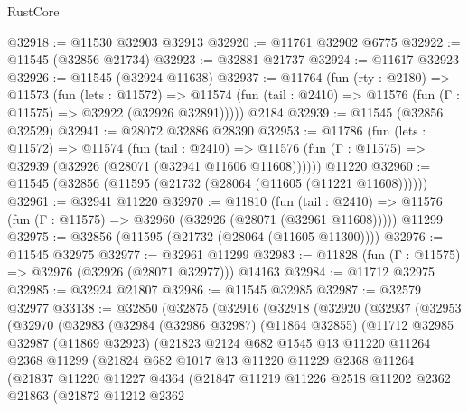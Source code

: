 \begin{lexlean}{RustCore}
\begin{coremodule}
@32918 := @11530 @32903 @32913
@32920 := @11761 @32902 @6775
@32922 := @11545 (@32856 @21734)
@32923 := @32881 @21737
@32924 := @11617 @32923
@32926 := @11545 (@32924 @11638)
@32937 := @11764
    (fun (rty : @2180) =>
    @11573
      (fun (lets : @11572) =>
      @11574 (fun (tail : @2410) => @11576 (fun (Γ : @11575) => @32922 (@32926 @32891)))))
    @2184
@32939 := @11545 (@32856 @32529)
@32941 := @28072 @32886 @28390
@32953 := @11786
    (fun (lets : @11572) =>
    @11574
      (fun (tail : @2410) =>
      @11576 (fun (Γ : @11575) => @32939 (@32926 (@28071 (@32941 @11606 @11608))))))
    @11220
@32960 := @11545 (@32856 (@11595 (@21732 (@28064 (@11605 (@11221 @11608))))))
@32961 := @32941 @11220
@32970 := @11810
    (fun (tail : @2410) => @11576 (fun (Γ : @11575) => @32960 (@32926 (@28071 (@32961 @11608)))))
    @11299
@32975 := @32856 (@11595 (@21732 (@28064 (@11605 @11300))))
@32976 := @11545 @32975
@32977 := @32961 @11299
@32983 := @11828 (fun (Γ : @11575) => @32976 (@32926 (@28071 @32977))) @14163
@32984 := @11712 @32975
@32985 := @32924 @21807
@32986 := @11545 @32985
@32987 := @32579 @32977
@33138 := @32850
    (@32875
      (@32916
        (@32918
          (@32920
            (@32937
              (@32953
                (@32970
                  (@32983
                    (@32984
                      (@32986 @32987)
                      (@11864 @32855)
                      (@11712
                        @32985
                        @32987
                        (@11869 @32923)
                        (@21823
                          @2124
                          @682
                          @1545
                          @13
                          @11220
                          @11264
                          @2368
                          @11299
                          (@21824
                            @682
                            @1017
                            @13
                            @11220
                            @11229
                            @2368
                            @11264
                            (@21837
                              @11220
                              @11227
                              @4364
                              (@21847
                                @11219
                                @11226
                                @2518
                                @11202
                                @2362
                                @21863
                                (@21872
                                  @11212
                                  @2362

\end{coremodule}
\end{lexlean}

